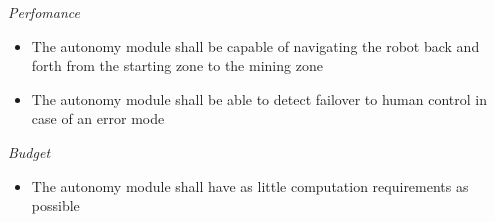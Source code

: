 \documentclass[class=article, crop=false]{standalone}
\begin{document}
\noindent
\emph{Perfomance}
\begin{itemize}
 \item The autonomy module shall be capable of navigating the robot back and forth from the starting zone to the mining zone
 \item The autonomy module shall be able to detect failover to human control in case of an error mode
\end{itemize}

\noindent
\emph{Budget}
\begin{itemize}
 \item The autonomy module shall have as little computation requirements as possible
\end{itemize}
\end{document}
